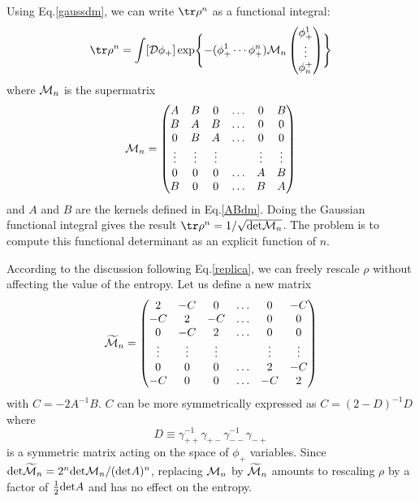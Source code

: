 \documentclass[12pt]{article}
\begin{document}
Using Eq.\ref{gaussdm}, we can write $\tr\rho^n$ as a functional integral:
\begin{equation}
\tr\rho^n =
\int [{\cal D} \phi_+] \exp
 \Biggl\{ -(\phi^1_+ \cdots \phi^n_+) {\cal M}_n
\begin{pmatrix}
\phi^1_+\\ \vdots\\ \phi^+_n \\
\end{pmatrix}
\Biggr\}
\end{equation}
where ${\cal M}_n$ is the supermatrix
\begin{equation}
{\cal M}_n = 
\begin{pmatrix}
A & B & 0 & \ldots & 0 & B \\
B & A & B & \ldots & 0 & 0 \\
0 & B & A & \ldots & 0 & 0 \\
\vdots & \vdots & \vdots && \vdots & \vdots \\
0 & 0 & 0 & \ldots & A & B \\
B & 0 & 0 & \ldots & B & A \\
\end{pmatrix}
\end{equation}
and $A$ and $B$ are the kernels defined in Eq.\ref{ABdm}. Doing the Gaussian
functional integral gives the result $\tr\rho^n =1/\sqrt{{\rm det}{\cal
M}_
 n}$.
The problem is to compute this functional determinant as an explicit
function of $n$.

According to the discussion following Eq.\ref{replica}, we can freely rescale
$\rho$ without affecting the value of the entropy. Let us define a new matrix
\begin{equation}
\widetilde{\cal M}_n =
\begin{pmatrix}
2 & -C & 0 & \ldots & 0& -C\cr
-C & 2 & -C & \ldots & 0 & 0\cr
 0 & -C & 2 & \ldots & 0 & 0\cr
\vdots & \vdots & \vdots &&\vdots & \vdots\cr
0 & 0 & 0 & \ldots & 2 & -C\cr
-C & 0 & 0 & \ldots & -C & 2\cr
\end{pmatrix}
\end{equation}
with $C=-2A^{-1}B$. $C$ can be more symmetrically expressed as
$C = (2-D)^{-1}D$ where
\begin{equation}
D \equiv \gamma_{++}^{-1}\gamma_{+-} \gamma_{--}^{-1}\gamma_{-+}
\label{entmat}
\end{equation}
is a symmetric matrix acting on the space of $\phi_+$ variables.
Since ${\rm det}\widetilde{\cal M}_n =
2^n {{\rm det}{\cal M}_n / ({\rm det} A)^n}$, replacing ${\cal M}_n$ by
$\widetilde{\cal M}_n$ amounts to rescaling $\rho$ by a factor of
${1\over 2}{\rm det} A$
and has no effect on the entropy.
\end{document}
